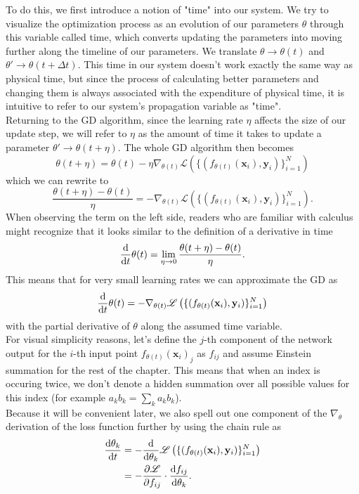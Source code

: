 To do this, we first introduce a notion of "time" into our system. We try to visualize the optimization process as an evolution of our parameters $\theta$ through this variable called time, which converts updating the parameters into moving further along the timeline of our parameters. We translate $\theta \rightarrow \theta(t)$ and $\theta' \rightarrow \theta(t+\Delta t)$. This time in our system doesn't work exactly the same way as physical time, but since the process of calculating better parameters and changing them is always associated with the expenditure of physical time, it is intuitive to refer to our system's propagation variable as "time". \\
Returning to the GD algorithm, since the learning rate $\eta$ affects the size of our update step, we will refer to $\eta$ as the amount of time it takes to update a parameter $\theta' \rightarrow \theta(t+\eta)$. The whole GD algorithm then becomes
\begin{equation}
	\theta(t+\eta) = \theta(t) - \eta \nabla_{\theta(t)} \mathscr{L}\left( \{(f_{\theta(t)}(\mathbf{x}_i), \mathbf{y}_i)\}_{i=1}^{N} \right)
\end{equation}
which we can rewrite to 
\begin{equation}
	\frac{\theta(t+\eta)-\theta(t)}{\eta} = - \nabla_{\theta(t)} \mathscr{L}\left( \{(f_{\theta(t)}(\mathbf{x}_i), \mathbf{y}_i)\}_{i=1}^{N} \right).
\end{equation}
When observing the term on the left side, readers who are familiar with calculus might recognize that it looks similar to the definition of a derivative in time
\begin{equation}
	\frac{\mathrm{d}}{\mathrm{d}t}\theta(t) = \lim_{\eta\rightarrow0} \frac{\theta(t+\eta)-\theta(t)}{\eta}.
\end{equation}
This means that for very small learning rates we can approximate the GD as 
\begin{equation}\label{eq:NTKThetaDerivative}
	\frac{\mathrm{d}}{\mathrm{d}t}\theta(t) = - \nabla_{\theta(t)} \mathscr{L}\left( \{(f_{\theta(t)}(\mathbf{x}_i), \mathbf{y}_i)\}_{i=1}^{N} \right)
\end{equation}
with the partial derivative of $\theta$ along the assumed time variable.\\
For visual simplicity reasons, let's define the $j$-th component of the network output for the $i$-th input point $f_{\theta(t)}(\mathbf{x}_i)_j$ as $f_{ij}$ and assume Einstein summation for the rest of the chapter.
This means that when an index is occuring twice, we don't denote a hidden summation over all possible values for this index (for example $a_kb_k = \sum_k a_kb_k$).\\
Because it will be convenient later, we also spell out one component of the $\nabla_\theta$ derivation of the loss function further by using the chain rule as
\begin{align}
	\frac{\mathrm{d}\theta_k}{\mathrm{d}t} &= - \frac{\mathrm{d}}{\mathrm{d}\theta_k}\mathscr{L}\left( \{(f_{\theta(t)}(\mathbf{x}_i), \mathbf{y}_i)\}_{i=1}^{N} \right)\nonumber\\
	&= - \frac{\partial\mathscr{L}}{\partial f_{ij}} \cdot \frac{\mathrm{d}f_{ij}}{\mathrm{d}\theta_k}.
\end{align} 

